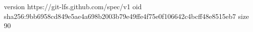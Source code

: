 version https://git-lfs.github.com/spec/v1
oid sha256:9bb6958cd849e5ae4a698b2003b79e49ffe4f75e0f106642c4bcff48e8515eb7
size 90
